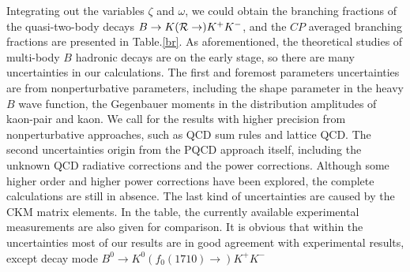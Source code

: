 \documentclass[11pt]{article}
\begin{document}
Integrating out the variables $\zeta$ and $\omega$, we could obtain the branching fractions of the quasi-two-body decays $B\to K({\cal R} \to) K^+K^-$, and the $CP$ averaged branching fractions are presented in Table.\ref{br}. As aforementioned, the theoretical studies of multi-body $B$ hadronic decays are on the early stage, so there are many uncertainties in our calculations. The first and foremost parameters uncertainties are from nonperturbative parameters, including the shape parameter in the heavy $B$ wave function, the Gegenbauer moments in the distribution amplitudes of kaon-pair and kaon. We call for the results with higher precision from nonperturbative approaches, such as QCD sum rules and lattice QCD.  The second uncertainties origin from the PQCD approach itself, including the unknown QCD radiative corrections and the power corrections. Although some higher order and higher power corrections have been explored, the complete calculations are still in absence. The last kind of uncertainties are caused by the CKM matrix elements. In the table, the currently available experimental measurements are also given for comparison. It is obvious that within the uncertainties most of our results are in good agreement with experimental results, except decay mode $B^0 \to K^0(f_0(1710)\to ) K^+ K^-$
\end{document}
